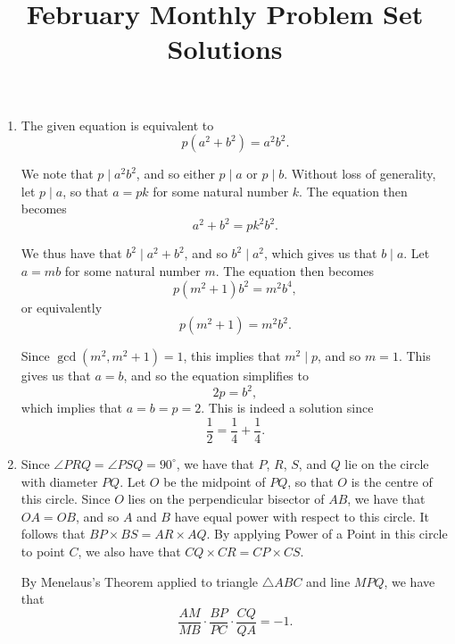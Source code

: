 \documentclass[12pt]{article}
\title{\vspace{-24pt}February Monthly Problem Set Solutions}
\author{\vspace{-24pt}}
\date{\vspace{-24pt}}
\begin{document}
 \maketitle \pagestyle{empty}

\begin{enumerate}

\item %
The given equation is equivalent to
\[
    p(a^2 + b^2) = a^2 b^2.
\]

We note that $p \mid a^2 b^2$, and so either $p \mid a$ or $p \mid
b$. Without loss of generality, let $p \mid a$, so that $a = pk$ for some
natural number $k$. The equation then becomes
\[
    a^2 + b^2 = pk^2 b^2.
\]

We thus have that $b^2 \mid a^2 + b^2$, and so $b^2 \mid a^2$, which
gives us that $b \mid a$. Let $a = mb$ for some natural number $m$. The
equation then becomes
\[
    p(m^2 + 1) b^2 = m^2 b^4,
\]
or equivalently
\[
    p(m^2 + 1) = m^2 b^2.
\]

Since $\gcd(m^2, m^2 + 1) = 1$, this implies that $m^2 \mid p$, and so $m =
1$. This gives us that $a = b$, and so the equation simplifies to
\[
    2p = b^2,
\]
which implies that $a = b = p = 2$. This is indeed a solution since
\[
    \frac{1}{2} = \frac{1}{4} + \frac{1}{4}.
\]

\item %
Since $\angle PRQ = \angle PSQ = 90^\circ$, we have that $P$, $R$, $S$, and $Q$
lie on the circle with diameter $PQ$. Let $O$ be the midpoint of $PQ$, so that
$O$ is the centre of this circle. Since $O$ lies on the perpendicular bisector
of $AB$, we have that $OA = OB$, and so $A$ and $B$ have equal power with
respect to this circle. It follows that $BP \times BS = AR \times AQ$. By
applying Power of a Point in this circle to point $C$, we also have that $CQ
\times CR = CP \times CS$.

By Menelaus's Theorem applied to triangle $\triangle ABC$ and line $MPQ$, we have that
\[
    \frac{AM}{MB} \cdot \frac{BP}{PC} \cdot \frac{CQ}{QA} = -1.
\]


\end{enumerate}
\end{document}
